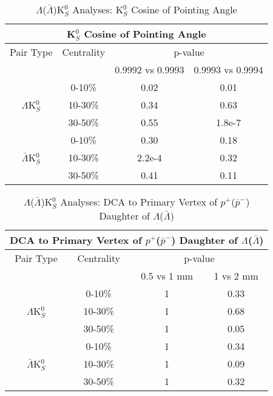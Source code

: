 \documentclass[../AnalysisNoteJBuxton.tex]{subfiles}
\begin{document}
\begin{table}
 \centering
 \begin{tabular}{|c|c|c|c|}
 \multicolumn{4}{c}{K$^{0}_{S}$ Cosine of Pointing Angle} \\
  \hline
  Pair Type & Centrality & \multicolumn{2}{c|}{p-value} \\
  \cline{3-4}
   & & 0.9992 vs 0.9993 & 0.9993 vs 0.9994 \\
  \hline
   & 0-10\% & 0.02 & 0.01 \\
  $\Lambda$K$^{0}_{S}$ 
   & 10-30\% & 0.34 & 0.63 \\
   & 30-50\% & 0.55 & 1.8e-7 \\
  \hline
   & 0-10\% & 0.30 & 0.18 \\
  $\bar{\Lambda}$K$^{0}_{S}$ 
   & 10-30\% & 2.2e-4 & 0.32 \\
   & 30-50\% & 0.41 & 0.11 \\
  \hline
 \end{tabular}
 \caption{$\Lambda$($\bar{\Lambda}$)K$^{0}_{S}$ Analyses: K$^{0}_{S}$ Cosine of Pointing Angle}
 \label{tab:K0CosPointingAngleLamK0}
\end{table}

\begin{table}
 \centering
 \begin{tabular}{|c|c|c|c|}
 \multicolumn{4}{c}{DCA to Primary Vertex of $p^{+}$($\bar{p}^{-}$) Daughter of $\Lambda$($\bar{\Lambda}$)} \\
  \hline
  Pair Type & Centrality & \multicolumn{2}{c|}{p-value} \\
  \cline{3-4}
   & & 0.5 vs 1 mm & 1 vs 2 mm \\
  \hline
   & 0-10\% & 1 & 0.33 \\
  $\Lambda$K$^{0}_{S}$ 
   & 10-30\% & 1 & 0.68 \\
   & 30-50\% & 1 & 0.05 \\
  \hline
   & 0-10\% & 1 & 0.34 \\
  $\bar{\Lambda}$K$^{0}_{S}$ 
   & 10-30\% & 1 & 0.09 \\
   & 30-50\% & 1 & 0.32 \\
  \hline
 \end{tabular}
 \caption{$\Lambda$($\bar{\Lambda}$)K$^{0}_{S}$ Analyses: DCA to Primary Vertex of $p^{+}$($\bar{p}^{-}$) Daughter of $\Lambda$($\bar{\Lambda}$)}
 \label{tab:DcaToPrimVertexProtonDaughtOfLamLamK0}
\end{table}
\end{document}
